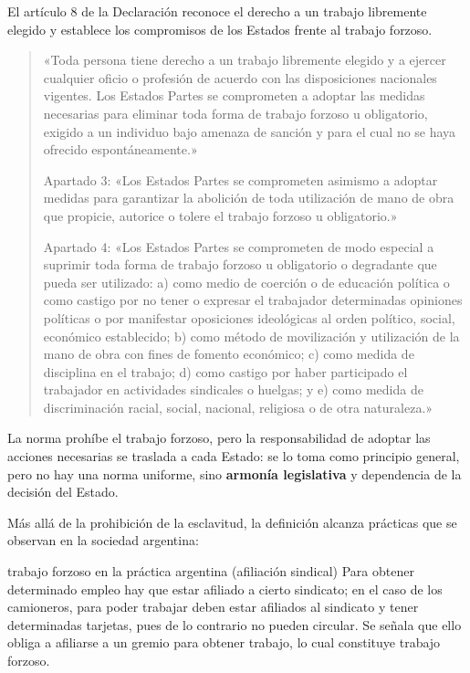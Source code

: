 \documentclass[12pt,oneside]{book}
\begin{document}
El artículo 8 de la Declaración reconoce el derecho a un trabajo libremente elegido y establece los compromisos de los Estados frente al trabajo forzoso.

\begin{quote}
«Toda persona tiene derecho a un trabajo libremente elegido y a ejercer cualquier oficio o profesión de acuerdo con las disposiciones nacionales vigentes. Los Estados Partes se comprometen a adoptar las medidas necesarias para eliminar toda forma de trabajo forzoso u obligatorio, exigido a un individuo bajo amenaza de sanción y para el cual no se haya ofrecido espontáneamente.»

Apartado 3: «Los Estados Partes se comprometen asimismo a adoptar medidas para garantizar la abolición de toda utilización de mano de obra que propicie, autorice o tolere el trabajo forzoso u obligatorio.»

Apartado 4: «Los Estados Partes se comprometen de modo especial a suprimir toda forma de trabajo forzoso u obligatorio o degradante que pueda ser utilizado: a) como medio de coerción o de educación política o como castigo por no tener o expresar el trabajador determinadas opiniones políticas o por manifestar oposiciones ideológicas al orden político, social, económico establecido; b) como método de movilización y utilización de la mano de obra con fines de fomento económico; c) como medida de disciplina en el trabajo; d) como castigo por haber participado el trabajador en actividades sindicales o huelgas; y e) como medida de discriminación racial, social, nacional, religiosa o de otra naturaleza.»
\end{quote}

La norma prohíbe el trabajo forzoso, pero la responsabilidad de adoptar las acciones necesarias se traslada a cada Estado: se lo toma como principio general, pero no hay una norma uniforme, sino \textbf{armonía legislativa} y dependencia de la decisión del Estado.

Más allá de la prohibición de la esclavitud, la definición alcanza prácticas que se observan en la sociedad argentina:

\begin{example}{trabajo forzoso en la práctica argentina (afiliación sindical)}
Para obtener determinado empleo hay que estar afiliado a cierto sindicato; en el caso de los camioneros, para poder trabajar deben estar afiliados al sindicato y tener determinadas tarjetas, pues de lo contrario no pueden circular. Se señala que ello obliga a afiliarse a un gremio para obtener trabajo, lo cual constituye trabajo forzoso.
\end{example}
\end{document}
